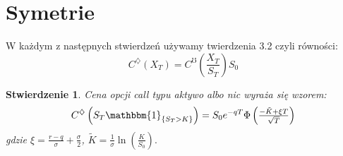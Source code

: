 \documentclass[11pt]{report}
\newtheorem{stw}{Stwierdzenie}[chapter]
\newcommand*{\Scale}[2][4]{\scalebox{#1}{$#2$}}%
\begin{document}
\section{Symetrie}
W każdym z następnych stwierdzeń używamy twierdzenia 3.2 czyli równości: 
\begin{equation*}
C^{\diamondsuit}(X_T) = C^{\mho} \left( \frac{X_T}{S_T}\right) S_0 
\end{equation*}


\begin{stw} Cena opcji call typu aktywo albo nic wyraża się wzorem:
\begin{equation*}
C^{\diamondsuit}\left( S_T \mathbbm{1}_{ \{ S_T>K \} } \right) = S_0 e^{-qT} \Scale[1.0]{  \Phi \left(\frac{ -\tilde{K}+\xi T }{\sqrt{T}} \right)  }
\end{equation*}
gdzie $\xi = \frac{r-q}{\sigma} + \frac{\sigma}{2}$, $\tilde{K} = \frac{1}{\sigma}\ln(\frac{K}{S_0}).$
\end{stw}
\end{document}
